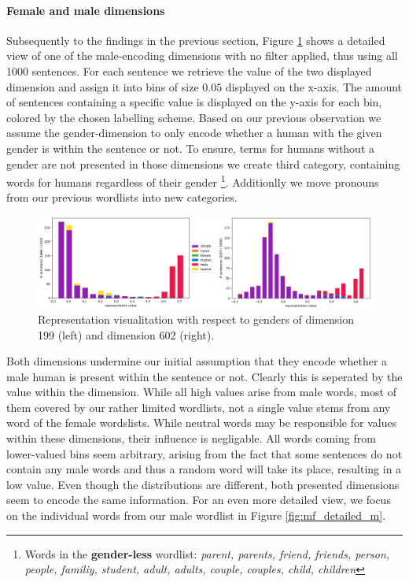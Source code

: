 \paragraph*{Female and male dimensions}
Subsequently to the findings in the previous section, Figure \ref{fig:mf_basic} shows a detailed view of one of the male-encoding dimensions with no filter applied, thus using all 1000 sentences. For each sentence we retrieve the value of the two displayed dimension and assign it into bins of size $0.05$ displayed on the x-axis. The amount of sentences containing a specific value is displayed on the y-axis for each bin, colored by the chosen labelling scheme. Based on our previous observation we assume the gender-dimension to only encode whether  a human with the given gender is within the sentence or not. To ensure, terms for humans without a gender are not presented in those dimensions we create  third category, containing words for humans regardless of their gender \footnote{Words in the \textbf{gender-less} wordlist: \textit{parent, parents, friend, friends, person, people, familiy, student, adult, adults, couple, couples, child, children}}. Additionlly we move pronouns from our previous wordlists into new categories. 
\begin{figure}[tph!]
\centering
	\includegraphics[totalheight=4.5cm]{fig/mf_basic.png}
	\caption{Representation visualitation with respect to genders of dimension 199 (left) and dimension 602 (right).}
	\label{fig:mf_basic}
\end{figure}
Both dimensions undermine our initial assumption that they encode whether a male human is present within the sentence or not. Clearly this is seperated by the value within the dimension. While all high values arise from male words, most of them covered by our rather limited wordlists, not a single value stems from any word of the female wordslists. While neutral words may be responsible for values within these dimensions, their influence is negligable. All words coming from lower-valued bins seem arbitrary, arising from the fact that some sentences do not contain any male words and thus a random word will take its place, resulting in a low value. Even though the distributions are different, both presented dimensions seem to encode the same information. For an even more detailed view, we focus on the individual words from our male wordlist in Figure \ref{fig:mf_detailed_m}.
